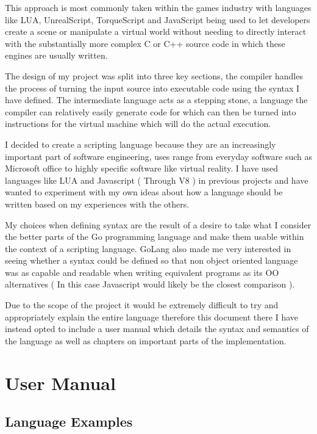 \documentclass[]{final_report}
\begin{document}
This approach is most commonly taken within the games industry with languages like LUA, UnrealScript, TorqueScript and JavaScript being used to let developers create a scene or manipulate a virtual world without needing to directly interact with the substantially more complex C or C++ source code in which these engines are usually written.

The design of my project was split into three key sections, the compiler handles the process of turning the input source into executable code using the syntax I have defined. The intermediate language acts as a stepping stone, a language the compiler can relatively easily generate code for which can then be turned into instructions for the virtual machine which will do the actual execution.

I decided to create a scripting language because they are an increasingly important part of software engineering, uses range from everyday software such as Microsoft office to highly specific software like virtual reality. I have used languages like LUA and Javascript ( Through V8 ) in previous projects and have wanted to experiment with my own ideas about how a language should be written based on my experiences with the others. 

My choices when defining syntax are the result of a desire to take what I consider the better parts of the Go programming language and make them usable within the context of a scripting language. GoLang also made me very interested in seeing whether a syntax could be defined so that non object oriented language was as capable and readable when writing equivalent programs as its OO alternatives ( In this case Javascript would likely be the closest comparison ).

Due to the scope of the project it would be extremely difficult to try and appropriately explain the entire language therefore this document there I have instead opted to include a user manual which details the syntax and semantics of the language as well as chapters on important parts of the implementation.

\chapter{User Manual}

\section{Language Examples}
\end{document}

